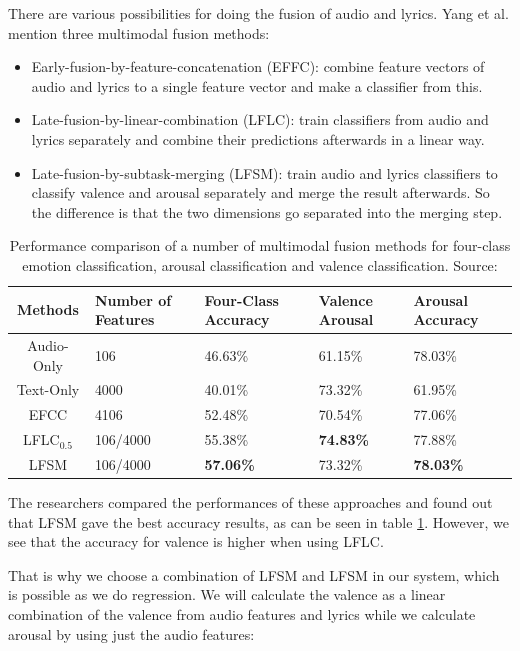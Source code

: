 \documentclass[10pt,journal,compsoc]{IEEEtran}
\begin{document}
There are various possibilities for doing the fusion of audio and lyrics. Yang et al. \cite{Yang} mention three multimodal fusion methods:
\begin{itemize}
	\item{Early-fusion-by-feature-concatenation (EFFC): combine feature vectors of audio and lyrics to a single feature vector and make a classifier from this.}
	\item{Late-fusion-by-linear-combination (LFLC): train classifiers from audio and lyrics separately and combine their predictions afterwards in a linear way.}
	\item{Late-fusion-by-subtask-merging (LFSM): train audio and lyrics classifiers to classify valence and arousal separately and merge the result afterwards. So the difference is that the two dimensions go separated into the merging step.}
\end{itemize}
\begin{table}[]
	\centering
	\caption{Performance comparison of a number of multimodal fusion methods for four-class emotion classification, arousal classification and valence classification. Source: \cite{Yang}}
	\begin{tabular}{|c|p{1.5cm} p{1.5cm} p{1.2cm} p{1.3cm}|}
		\hline
		Methods & Number of Features & Four-Class Accuracy & Valence Arousal & Arousal Accuracy \\ \hline
		Audio-Only & 106 & 46.63\% & 61.15\% & 78.03\% \\
		Text-Only & 4000 & 40.01\% & 73.32\% & 61.95\% \\
		EFCC & 4106 & 52.48\% & 70.54\% & 77.06\% \\
		LFLC$_{0.5}$ & 106/4000 & 55.38\% & \textbf{74.83\%} & 77.88\%\\
		LFSM & 106/4000 & \textbf{57.06\%} & 73.32\% & \textbf{78.03\%}\\ 
		\hline
	\end{tabular}
	\label{tb:ya}
\end{table}
The researchers compared the performances of these approaches and found out that LFSM gave the best accuracy results, as can be seen in table \ref{tb:ya}. However, we see that the accuracy for valence is higher when using LFLC.

That is why we choose a combination of LFSM and LFSM in our system, which is possible as we do regression. We will calculate the valence as a linear combination of the valence from audio features and lyrics while we calculate arousal by using just the audio features:
\end{document}
